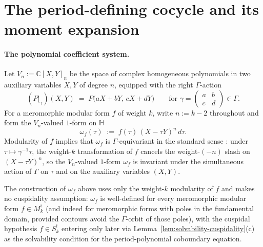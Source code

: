 \documentclass[11pt]{article}
\numberwithin{equation}{section}  %
\newcommand{\HH}{\mathbb{H}}
\newcommand{\CC}{\mathbb{C}}
\begin{document}

\section{The period-defining cocycle and its moment expansion}\label{sec:cocycle}

\paragraph{The polynomial coefficient system.}
Let $V_n := \CC[X, Y]_n$ be the space of complex homogeneous polynomials
in two auxiliary variables $X, Y$ of degree $n$, equipped with the
right $\Gamma$-action
\begin{equation}
  (P|_\gamma)(X, Y) \;=\; P\bigl(aX + bY,\, cX + dY\bigr)
  \qquad
  \text{for } \gamma = \begin{pmatrix}a & b\\ c & d\end{pmatrix} \in \Gamma.
\end{equation}
For a meromorphic modular form $f$ of weight $k$, write $n := k - 2$
throughout and form the $V_n$-valued $1$-form on $\HH$
\begin{equation}
  \omega_f(\tau) \;:=\; f(\tau)\,(X - \tau Y)^n\,d\tau.
\end{equation}
Modularity of $f$ implies that $\omega_f$ is $\Gamma$-equivariant in
the standard sense \cite{KZ1984}: under $\tau \mapsto \gamma^{-1}\tau$,
the weight-$k$ transformation of $f$ cancels the weight-$(-n)$ slash
on $(X - \tau Y)^n$, so the $V_n$-valued $1$-form $\omega_f$ is
invariant under the simultaneous action of $\Gamma$ on $\tau$ and on
the auxiliary variables $(X, Y)$.  %

The construction of $\omega_f$ above uses only the weight-$k$ modularity
of $f$ and makes no cuspidality assumption: $\omega_f$ is well-defined
for every meromorphic modular form $f \in M^!_k$ (and indeed for
meromorphic forms with poles in the fundamental domain, provided
contours avoid the $\Gamma$-orbit of those poles), with the cuspidal
hypothesis $f \in S^!_k$ entering only later via
Lemma~\ref{lem:solvability-cuspidality}(c) as the solvability
condition for the period-polynomial coboundary equation.
\end{document}
